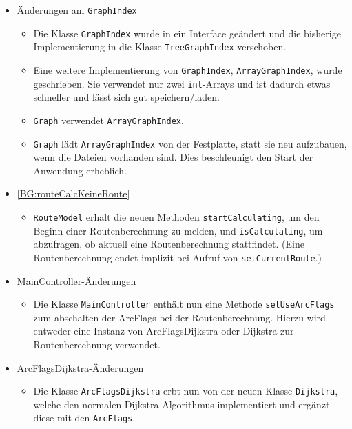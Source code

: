 \documentclass[a4paper, 11pt]{article}
\newcommand{\code}[1]{\texttt{#1}}
\begin{document}
\begin{itemize}
\item Änderungen am \code{GraphIndex}
  \begin{itemize}
  \item Die Klasse \code{GraphIndex} wurde in ein Interface geändert und die bisherige Implementierung in die Klasse \code{TreeGraphIndex} verschoben.
  \item Eine weitere Implementierung von \code{GraphIndex}, \code{ArrayGraphIndex}, wurde geschrieben.
  Sie verwendet nur zwei \code{int}-Arrays und ist dadurch etwas schneller und lässt sich gut speichern/laden.
  \item \code{Graph} verwendet \code{ArrayGraphIndex}.
  \item \code{Graph} lädt \code{ArrayGraphIndex} von der Festplatte, statt sie neu aufzubauen, wenn die Dateien vorhanden sind. Dies beschleunigt den Start der Anwendung erheblich.
  \end{itemize}
\item\label{change:routeCalcKeineRoute} \ref{BG:routeCalcKeineRoute}
  \begin{itemize}
  \item \code{RouteModel} erhält die neuen Methoden \code{startCalculating}, um den Beginn einer Routenberechnung zu melden, und \code{isCalculating}, um abzufragen, ob aktuell eine Routenberechnung stattfindet.
  (Eine Routenberechnung endet implizit bei Aufruf von \code{setCurrentRoute}.)
  \end{itemize}
  \item MainController-Änderungen
    \begin{itemize}
    \item Die Klasse \code{MainController} enthält nun eine Methode \code{setUseArcFlags} zum abschalten der ArcFlags bei der Routenberechnung. Hierzu wird entweder eine Instanz von ArcFlagsDijkstra oder Dijkstra zur Routenberechnung verwendet.
    \end{itemize}
  \item ArcFlagsDijkstra-Änderungen
    \begin{itemize}
    \item Die Klasse \code{ArcFlagsDijkstra} erbt nun von der neuen Klasse \code{Dijkstra}, welche den normalen Dijkstra-Algorithmus implementiert und ergänzt diese mit den \code{ArcFlags}.
    \end{itemize}
\end{itemize}

\makeatletter
{}
\makeatother
\printglossary[type=main, title={Glossar}, toctitle={Glossar}, style=myAltlist]
\end{document}
